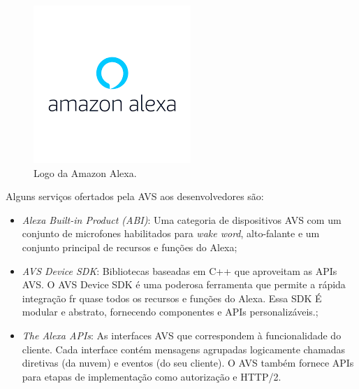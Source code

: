 \begin{figure}[htb]
	\caption{Logo da Amazon Alexa.}
	\begin{center}
		\includegraphics[scale=0.7]{Imagens/logo_amazon_alexa.png}
	\end{center}
	\label{fig_logo_alexa}
\end{figure}

Alguns serviços ofertados pela AVS aos desenvolvedores são:
\begin{itemize}
	\item \textit{Alexa Built-in Product (ABI)}: Uma categoria de dispositivos AVS com um conjunto de microfones habilitados para \textit{wake word}, alto-falante e um conjunto principal de recursos e funções do Alexa;
	\item \textit{AVS Device SDK}: Bibliotecas baseadas em C++ que aproveitam as APIs AVS. O AVS Device SDK é uma poderosa ferramenta que permite a rápida integração fr quase todos os recursos e funções do Alexa. Essa SDK É modular e abstrato, fornecendo componentes e APIs personalizáveis.;
	\item \textit{The Alexa APIs}: As interfaces AVS que correspondem à funcionalidade do cliente. Cada interface contém mensagens agrupadas logicamente chamadas diretivas (da nuvem) e eventos (do seu cliente). O AVS também fornece APIs para etapas de implementação como autorização e HTTP/2.
\end{itemize}

